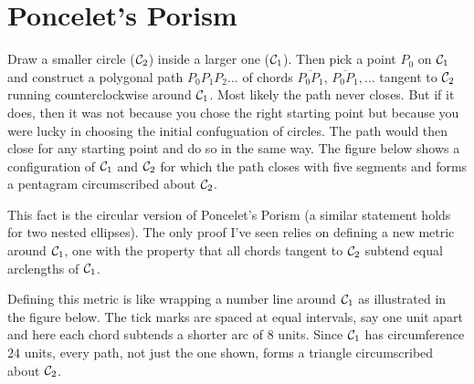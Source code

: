 \documentclass{ximera}
\begin{document}
\section*{Poncelet's Porism}




Draw a smaller circle (${\cal C}_2$) inside a larger one (${\cal C}_1$). Then pick a point $P_0$ on ${\cal C}_1$ and construct a polygonal path $P_0 P_1 P_2 \ldots$ of chords $\overline{P_0P_1}$, $\overline{P_0P_1}, \ldots$ tangent to ${\cal C}_2$ running counterclockwise around ${\cal C}_1$. Most likely the path never closes.  But if it does, then it was not because you chose the right starting point but because you were lucky in choosing the initial confuguation of circles. The path would then close for any starting point and do so in the same way. The figure below shows a configuration of ${\cal C}_1$ and ${\cal C}_2$ for which the path closes with five segments and forms a pentagram circumscribed about ${\cal C}_2$.


This fact is the circular version of Poncelet's Porism (a similar statement holds for two nested ellipses). The only proof I've seen relies on defining a new metric around ${\cal C}_1$, one with the property that all chords tangent to ${\cal C}_2$ subtend equal arclengths of ${\cal C}_1$. 

Defining this metric is like wrapping a number line around ${\cal C}_1$ as illustrated in the figure below. The tick marks are spaced at equal intervals, say one unit apart and here each chord subtends a shorter arc of $8$ units. Since ${\cal C}_1$ has circumference $24$ units, every path, not just the one shown, forms a triangle circumscribed about ${\cal C}_2$.  
\end{document}
